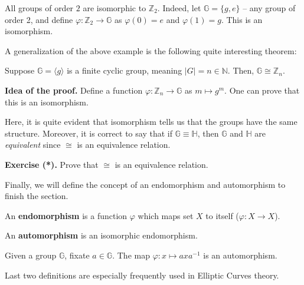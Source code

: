 \documentclass[../lecture-notes.tex]{subfiles}
\begin{document}
\begin{example}
    All groups of order $2$ are isomorphic to $\mathbb{Z}_2$. Indeed, let $\mathbb{G} = \{g,e\}$ -- any group of order 2, and define $\varphi: \mathbb{Z}_2 \to \mathbb{G}$ as $\varphi(0) = e$ and $\varphi(1) = g$. This is an isomorphism.
\end{example}

A generalization of the above example is the following quite interesting theorem:

\begin{theorem}
    Suppose $\mathbb{G} = \langle g \rangle$ is a finite cyclic group, meaning $|G| = n \in \mathbb{N}$. Then, $\mathbb{G} \cong \mathbb{Z}_n$.
\end{theorem}

\textbf{Idea of the proof.} Define a function $\varphi: \mathbb{Z}_n \to \mathbb{G}$ as $m \mapsto g^m$. One can prove that this is an isomorphism.

Here, it is quite evident that isomorphism tells us that the groups have the same structure. Moreover, it is correct to say that if $\mathbb{G} \equiv \mathbb{H}$, then $\mathbb{G}$ and $\mathbb{H}$ are \textit{equivalent} since $\cong$ is an equivalence relation.

\textbf{Exercise (*).} Prove that $\cong$ is an equivalence relation.

Finally, we will define the concept of an endomorphism and automorphism to finish the section.

\begin{definition}
    An \textbf{endomorphism} is a function $\varphi$ which maps set $X$ to itself ($\varphi: X \to X$).
\end{definition}

\vspace{-1.5em}

\begin{definition}
    An \textbf{automorphism} is an isomorphic endomorphism.
\end{definition}

\vspace{-1.5em}

\begin{example}
    Given a group $\mathbb{G}$, fixate $a \in \mathbb{G}$. The map $\varphi: x \mapsto axa^{-1}$ is an automorphism.
\end{example}

\vspace{-0.5em}

Last two definitions are especially frequently used in Elliptic Curves theory.
\end{document}
